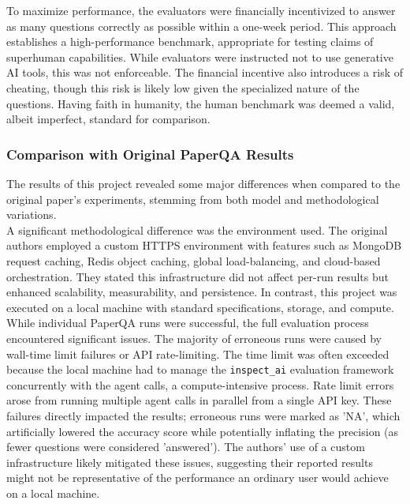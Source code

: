 To maximize performance, the evaluators were financially incentivized to answer as many questions correctly as possible within a one-week period. This approach establishes a high-performance benchmark, appropriate for testing claims of superhuman capabilities. While evaluators were instructed not to use generative AI tools, this was not enforceable. The financial incentive also introduces a risk of cheating, though this risk is likely low given the specialized nature of the questions. Having faith in humanity, the human benchmark was deemed a valid, albeit imperfect, standard for comparison. \\

\subsubsection{Comparison with Original PaperQA Results}
The results of this project revealed some major differences when compared to the original paper's experiments, stemming from both model and methodological variations. \\

A significant methodological difference was the environment used. The original authors employed a custom HTTPS environment with features such as MongoDB request caching, Redis object caching, global load-balancing, and cloud-based orchestration. They stated this infrastructure did not affect per-run results but enhanced scalability, measurability, and persistence. In contrast, this project was executed on a local machine with standard specifications, storage, and compute. While individual PaperQA runs were successful, the full evaluation process encountered significant issues. The majority of erroneous runs were caused by wall-time limit failures or API rate-limiting. The time limit was often exceeded because the local machine had to manage the \texttt{inspect\_ai} evaluation framework concurrently with the agent calls, a compute-intensive process. Rate limit errors arose from running multiple agent calls in parallel from a single API key. These failures directly impacted the results; erroneous runs were marked as 'NA', which artificially lowered the accuracy score while potentially inflating the precision (as fewer questions were considered 'answered'). The authors' use of a custom infrastructure likely mitigated these issues, suggesting their reported results might not be representative of the performance an ordinary user would achieve on a local machine. \\


